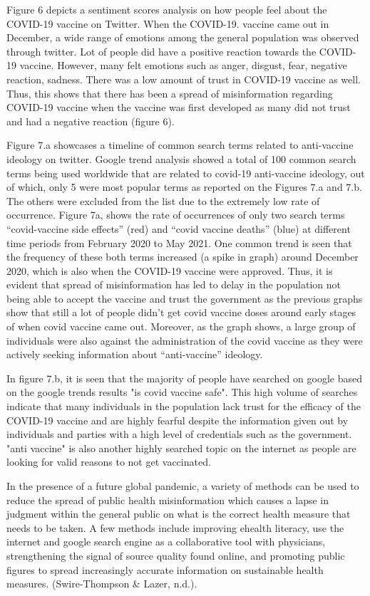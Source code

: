 \documentclass[10pt,twocolumn,letterpaper]{article}
\begin{document}
Figure 6 depicts a sentiment scores analysis on how people feel about  the COVID-19 vaccine on Twitter. When the COVID-19. vaccine came out in December, a wide range of emotions among the general population was observed through twitter. Lot of people did have a positive reaction towards the COVID-19 vaccine. However, many felt emotions such as anger, disgust, fear, negative reaction, sadness. There was a low amount of trust in COVID-19 vaccine as well. Thus, this shows that there has been a spread of misinformation regarding COVID-19 vaccine when the vaccine was first developed as many did not trust and had a negative reaction (figure 6). 

Figure 7.a showcases a timeline of common search terms related to anti-vaccine ideology on twitter. Google trend analysis showed  a total of 100 common search terms being used worldwide that are related to covid-19 anti-vaccine ideology, out of which, only 5 were most popular terms as reported on the Figures 7.a and 7.b.  The others were excluded from the list due to the extremely low rate of occurrence. Figure 7a, shows the rate of occurrences of only two search terms “covid-vaccine side effects” (red) and “covid vaccine deaths” (blue) at different time periods from February 2020 to May 2021. One common trend is seen that the frequency of these both terms increased (a spike in graph) around December 2020, which is also when the COVID-19 vaccine were approved. Thus, it is evident that spread of misinformation has led to delay in the population not being able to accept the vaccine and trust the government as the previous graphs show that still a lot of people didn't get covid vaccine doses around early stages of when covid vaccine came out. Moreover, as the graph shows, a large group of individuals were also against the administration of the covid vaccine as they were actively seeking information about “anti-vaccine” ideology. 

In figure 7.b, it is seen that the majority of people have searched on google based on the google trends results "is covid vaccine safe". This high volume of searches indicate that many individuals in the population lack trust for the efficacy of the COVID-19 vaccine and are highly fearful despite the information given out by individuals and parties with a high level of credentials such as the government. "anti vaccine" is also another highly searched topic on the internet as people are looking for valid reasons to not get vaccinated. 

In the presence of a future global pandemic, a variety of methods can be used to reduce the spread of public health misinformation which causes a lapse in judgment within the general public on what is the correct health measure that needs to be taken. A few methods include improving ehealth literacy, use the internet and google search engine as a collaborative tool with physicians, strengthening the signal of source quality found online, and promoting public figures to spread increasingly accurate information on sustainable health measures. (Swire-Thompson & Lazer, n.d.). 
\end{document}
